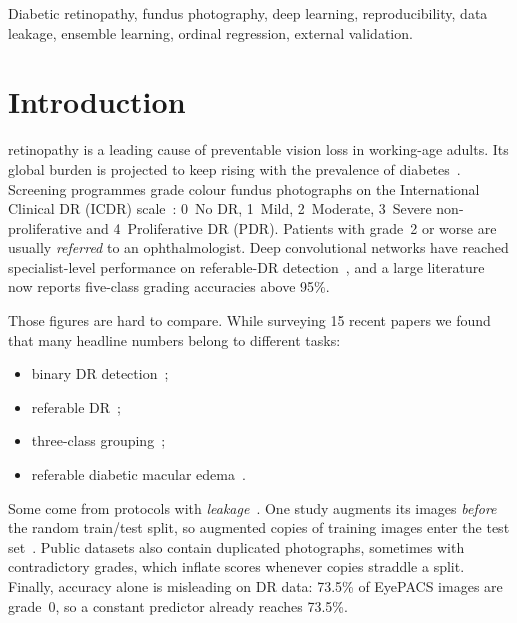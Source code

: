 \documentclass[journal]{IEEEtran}
\begin{document}
\begin{IEEEkeywords}
Diabetic retinopathy, fundus photography, deep learning, reproducibility, data leakage,
ensemble learning, ordinal regression, external validation.
\end{IEEEkeywords}

\section{Introduction}
 retinopathy is a leading cause of preventable vision loss in working-age
adults. Its global burden is projected to keep rising with the prevalence of diabetes~\cite{teo2021global}.
Screening programmes grade colour fundus photographs on the International Clinical DR (ICDR)
scale~\cite{wilkinson2003icdr}: 0~No DR, 1~Mild, 2~Moderate, 3~Severe non-proliferative and
4~Proliferative DR (PDR). Patients with grade~2 or worse are usually \emph{referred} to an
ophthalmologist. Deep convolutional networks have reached specialist-level performance on referable-DR
detection~\cite{gulshan2016development,abramoff2018pivotal}, and a large literature now reports
five-class grading accuracies above 95\%.

Those figures are hard to compare. While surveying 15 recent papers we found that many headline
numbers belong to different tasks:
\begin{itemize}
\item binary DR detection~\cite{butt2022hybrid,zafar2025lightweight};
\item referable DR~\cite{gulshan2016development,papadopoulos2021mil};
\item three-class grouping~\cite{butt2022hybrid};
\item referable diabetic macular edema~\cite{yaqoob2021resnet}.
\end{itemize}
Some come from protocols with \emph{leakage}~\cite{kaufman2012leakage}. One study augments its images
\emph{before} the random train/test split, so augmented copies of training images enter the test
set~\cite{zafar2025lightweight}. Public datasets also contain duplicated photographs, sometimes with
contradictory grades, which inflate scores whenever copies straddle a split. Finally, accuracy alone
is misleading on DR data: 73.5\% of EyePACS images are grade~0, so a constant predictor already
reaches 73.5\%.
\end{document}
